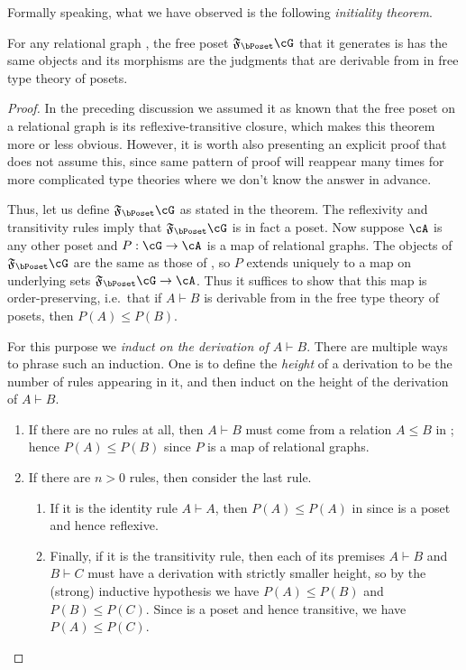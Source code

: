 \documentclass{book}
\let\types\vdash
\newcommand{\F}[1]{\mathfrak{F}_{#1}}
\begin{document}
Formally speaking, what we have observed is the following \emph{initiality theorem}.

\begin{thm}\label{thm:poset-initial-1}
  For any relational graph \cG, the free poset $\F{\bPoset}\cG$ that it generates is has the same objects and its morphisms are the judgments that are derivable from \cG in free type theory of posets.
\end{thm}
\begin{proof}
  In the preceding discussion we assumed it as known that the free poset on a relational graph is its reflexive-transitive closure, which makes this theorem more or less obvious.
  However, it is worth also presenting an explicit proof that does not assume this, since same pattern of proof will reappear many times for more complicated type theories where we don't know the answer in advance.

  Thus, let us define $\F{\bPoset}\cG$ as stated in the theorem.
  The reflexivity and transitivity rules imply that $\F{\bPoset}\cG$ is in fact a poset.
  Now suppose $\cA$ is any other poset and $P:\cG\to\cA$ is a map of relational graphs.
  The objects of $\F{\bPoset}\cG$ are the same as those of \cG, so $P$ extends uniquely to a map on underlying sets $\F{\bPoset}\cG\to\cA$.
  Thus it suffices to show that this map is order-preserving, i.e.\ that if $A\types B$ is derivable from \cG in the free type theory of posets, then $P(A)\le P(B)$.

  For this purpose we \emph{induct on the derivation of $A\types B$}.
  There are multiple ways to phrase such an induction.
  One is to define the \emph{height} of a derivation to be the number of rules appearing in it, and then induct on the height of the derivation of $A\types B$.
  \begin{enumerate}
  \item If there are no rules at all, then $A\types B$ must come from a relation $A\le B$ in \cG; hence $P(A)\le P(B)$ since $P$ is a map of relational graphs.
  \item If there are $n>0$ rules, then consider the last rule.
    \begin{enumerate}
    \item If it is the identity rule $A\types A$, then $P(A)\le P(A)$ in \cA since \cA is a poset and hence reflexive.
    \item Finally, if it is the transitivity rule, then each of its premises $A\types B$ and $B\types C$ must have a derivation with strictly smaller height, so by the (strong) inductive hypothesis we have $P(A)\le P(B)$ and $P(B)\le P(C)$.
      Since \cA is a poset and hence transitive, we have $P(A)\le P(C)$.\qedhere
    \end{enumerate}
  \end{enumerate}
\end{proof}
\end{document}
